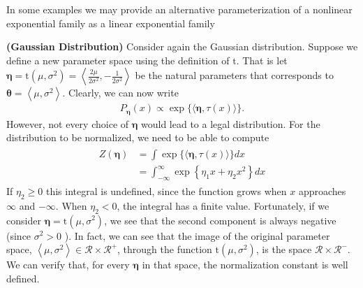 \documentclass{article}
\newcommand{\bfs}[1]{\textbf{({#1}) }}
\begin{document}
In some examples we may provide an alternative parameterization of a nonlinear exponential family as a linear exponential family
\begin{exma}\bfs{Gaussian Distribution}
Consider again the Gaussian distribution. Suppose we define a new parameter space using the definition of $\mathrm{t}$. That is let $\boldsymbol{\eta}=\mathrm{t}\left(\mu, \sigma^{2}\right)=\left\langle\frac{2 \mu}{2 \sigma^{2}},-\frac{1}{2 \sigma^{2}}\right\rangle$ be the natural parameters that corresponds to $\boldsymbol{\theta}=\left\langle\mu, \sigma^{2}\right\rangle$. Clearly, we can now write
\begin{align*}
P_{\boldsymbol{\eta}}(x) \propto \exp \{\langle\boldsymbol{\eta}, \tau(x)\rangle\} .
\end{align*}
However, not every choice of $\boldsymbol{\eta}$ would lead to a legal distribution. For the distribution to be normalized, we need to be able to compute
\begin{align*}
\begin{aligned}
Z(\boldsymbol{\eta}) &=\int \exp \{\langle\boldsymbol{\eta}, \tau(x)\rangle\} d x \\
&=\int_{-\infty}^{\infty} \exp \left\{\eta_{1} x+\eta_{2} x^{2}\right\} d x
\end{aligned}
\end{align*}
If $\eta_{2} \geq 0$ this integral is undefined, since the function grows when $x$ approaches $\infty$ and $-\infty .$ When $\eta_{2}<0$, the integral has a finite value. Fortunately, if we consider $\boldsymbol{\eta}=\mathrm{t}\left(\mu, \sigma^{2}\right)$, we see that the second component is always negative (since $\sigma^{2}>0$ ). In fact, we can see that the image of the original parameter space, $\left\langle\mu, \sigma^{2}\right\rangle \in \mathcal{R} \times \mathcal{R}^{+}$, through the function $\mathrm{t}\left(\mu, \sigma^{2}\right)$, is the space $\mathcal{R} \times \mathcal{R}^{-}$. We can verify that, for every $\boldsymbol{\eta}$ in that space, the normalization constant is well defined.
\end{exma}
\end{document}

